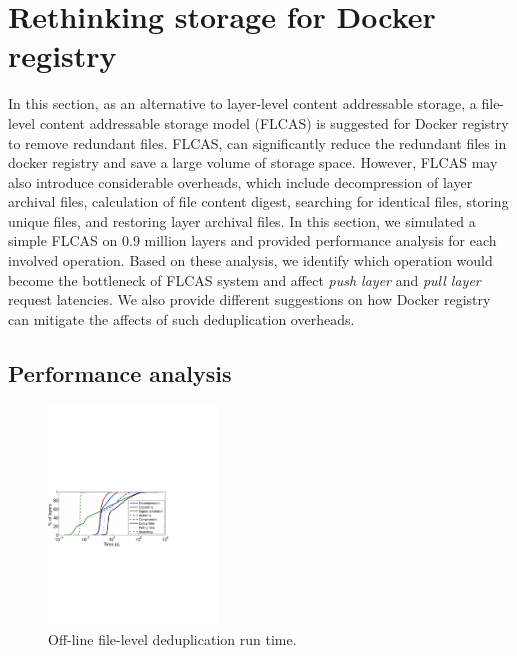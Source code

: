\section{Rethinking storage for Docker registry}
\label{sec:file_adressable}
%
%
In this section, as an alternative to layer-level content addressable storage,
a file-level content addressable storage model (FLCAS) is suggested for Docker
registry to remove redundant files.
%
FLCAS, can significantly reduce the redundant files in docker registry and save
a large volume of storage space.
%
However, FLCAS may also introduce considerable
overheads, which include 
decompression of layer archival files,
calculation of file content digest, 
searching for identical files, 
storing unique files,
and restoring layer archival files.
%
In this section, we simulated a simple FLCAS on 0.9 million layers and provided performance analysis for each involved operation. 
%
Based on these analysis, we identify which operation would become the bottleneck of FLCAS system and affect \emph{push layer} and \emph{pull layer}
request latencies.
%
We also provide different suggestions on how Docker registry can mitigate
the affects of such deduplication overheads. 
%
%
\subsection{Performance analysis}
%
\begin{figure}
	\centering
	\includegraphics[width=0.4\textwidth]{graphs/res-time.pdf}
	\caption{Off-line file-level deduplication run time.
	}
	\label{fig:dedup-res}
\end{figure}

